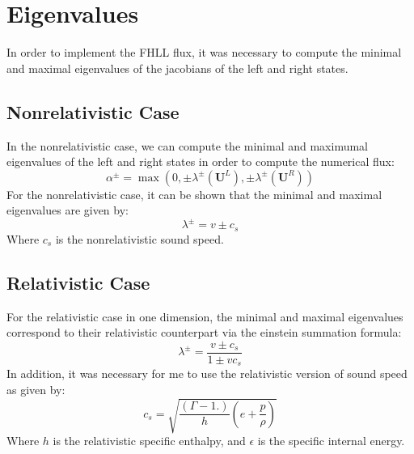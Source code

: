 \section{Eigenvalues}
In order to implement the FHLL flux, it was necessary to compute the minimal and maximal eigenvalues of the jacobians of the left and right states. 
\subsection{Nonrelativistic Case}
In the nonrelativistic case, we can compute the minimal and maximumal eigenvalues of the left and right states in order to compute the numerical flux:
$$\alpha^{\pm}=\max(0,\pm\lambda^{\pm}(\bm{U}^L),\pm\lambda^{\pm}(\bm{U}^R))$$
For the nonrelativistic case, it can be shown that the minimal and maximal eigenvalues are given by:
$$\lambda^{\pm}=v\pm c_s$$
Where $c_s$ is the nonrelativistic sound speed. 
\subsection{Relativistic Case}
For the relativistic case in one dimension, the minimal and maximal eigenvalues correspond to their relativistic counterpart via the einstein summation formula:
$$\lambda^{\pm}=\frac{v\pm c_s}{1\pm v c_s}$$
In addition, it was necessary for me to use the relativistic version of sound speed as given by:
$$c_s=\sqrt{\frac{(\Gamma-1.)}{h}(e+\frac{p}{\rho})}$$
Where $h$ is the relativistic specific enthalpy, and $\epsilon$ is the specific internal energy. 
